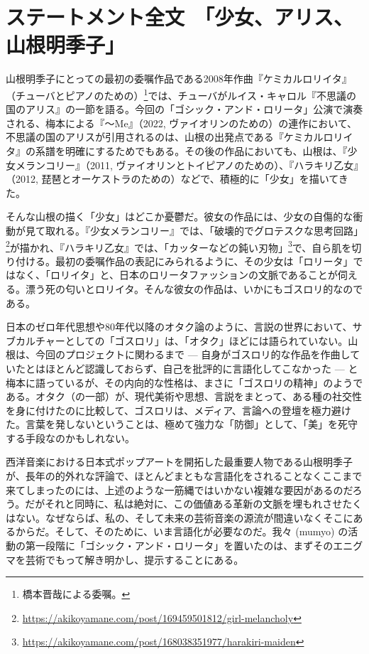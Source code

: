 \documentclass[a4paper, twoside]{ltjsarticle}
\begin{document}
\samepage
{}
\newpage

\section*{ステートメント全文　「少女、アリス、山根明季子」}

山根明季子にとっての最初の委嘱作品である2008年作曲『ケミカルロリイタ』（チューバとピアノのための）\footnote{ 橋本晋哉による委嘱。}では、チューバがルイス・キャロル『不思議の国のアリス』の一節を語る。今回の「ゴシック・アンド・ロリータ」公演で演奏される、梅本による『～Me』（2022, ヴァイオリンのための）の連作において、不思議の国のアリスが引用されるのは、山根の出発点である『ケミカルロリイタ』の系譜を明確にするためでもある。その後の作品においても、山根は、『少女メランコリー』（2011, ヴァイオリンとトイピアノのための）、『ハラキリ乙女』（2012, 琵琶とオーケストラのための）などで、積極的に「少女」を描いてきた。

そんな山根の描く「少女」はどこか憂鬱だ。彼女の作品には、少女の自傷的な衝動が見て取れる。『少女メランコリー』では、「破壊的でグロテスクな思考回路」\footnote{\url{ https://akikoyamane.com/post/169459501812/girl-melancholy}}が描かれ、『ハラキリ乙女』では、「カッターなどの鈍い刃物」\footnote{\url{https://akikoyamane.com/post/168038351977/harakiri-maiden}}で、自ら肌を切り付ける。最初の委嘱作品の表記にみられるように、その少女は「ロリータ」ではなく、「ロリイタ」と、日本のロリータファッションの文脈であることが伺える。漂う死の匂いとロリイタ。そんな彼女の作品は、いかにもゴスロリ的なのである。

日本のゼロ年代思想や80年代以降のオタク論のように、言説の世界において、サブカルチャーとしての「ゴスロリ」は、「オタク」ほどには語られていない。山根は、今回のプロジェクトに関わるまで --- 自身がゴスロリ的な作品を作曲していたとはほとんど認識しておらず、自己を批評的に言語化してこなかった --- と梅本に語っているが、その内向的な性格は、まさに「ゴスロリの精神」のようである。オタク（の一部）が、現代美術や思想、言説をまとって、ある種の社交性を身に付けたのに比較して、ゴスロリは、メディア、言論への登壇を極力避けた。言葉を発しないということは、極めて強力な「防御」として、「美」を死守する手段なのかもしれない。

西洋音楽における日本式ポップアートを開拓した最重要人物である山根明季子が、長年の的外れな評論で、ほとんどまともな言語化をされることなくここまで来てしまったのには、上述のような一筋縄ではいかない複雑な要因があるのだろう。だがそれと同時に、私は絶対に、この価値ある革新の文脈を埋もれさせたくはない。なぜならば、私の、そして未来の芸術音楽の源流が間違いなくそこにあるからだ。そして、そのために、いま言語化が必要なのだ。我々 (mumyo) の活動の第一段階に「ゴシック・アンド・ロリータ」を置いたのは、まずそのエニグマを芸術でもって解き明かし、提示することにある。
\end{document}
